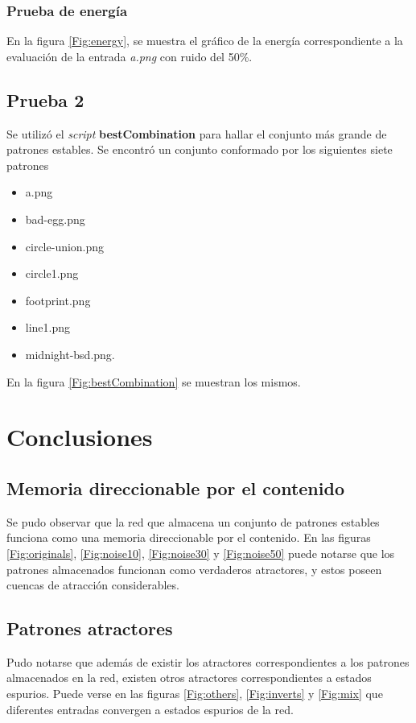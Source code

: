 \documentclass{article}
\begin{document}
\subsubsection{Prueba de energía}

En la figura \ref{Fig:energy}, se muestra el gráfico de la energía correspondiente a la evaluación de la entrada
\emph{a.png} con ruido del 50\%.

\subsection{Prueba 2}
Se utilizó el \emph{script} \textbf{bestCombination} para hallar el conjunto más grande de patrones estables. Se encontró
un conjunto conformado por los siguientes siete patrones

\begin{itemize}
 \item a.png
 \item bad-egg.png
 \item circle-union.png
 \item circle1.png
 \item footprint.png
 \item line1.png
 \item midnight-bsd.png.
\end{itemize}
En la figura \ref{Fig:bestCombination} se muestran los mismos.



\section{Conclusiones}

 \subsection{Memoria direccionable por el contenido}
 Se pudo observar que la red que almacena un conjunto de patrones estables funciona como una memoria direccionable por el contenido.
 En las figuras \ref{Fig:originals}, \ref{Fig:noise10}, \ref{Fig:noise30} y \ref{Fig:noise50} puede notarse que los patrones almacenados
 funcionan como verdaderos atractores, y estos poseen cuencas de atracción considerables.
 
 \subsection{Patrones atractores}
 Pudo notarse que además de existir los atractores correspondientes a los patrones almacenados en la red, existen otros atractores
 correspondientes a estados espurios. Puede verse en las figuras \ref{Fig:others}, \ref{Fig:inverts} y \ref{Fig:mix} que diferentes entradas
 convergen a estados espurios de la red.\\
 
\end{document}
